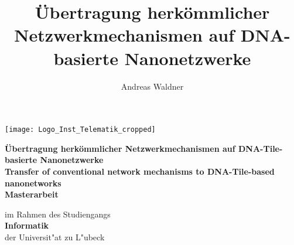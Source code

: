

\newcommand{\titlepageskip}{\vskip 20pt}

\begin{titlepage}

\title{Übertragung herkömmlicher Netzwerkmechanismen auf DNA-basierte Nanonetzwerke}
\author{Andreas Waldner}

{\Large
	\texttt{[image: Logo\_Inst\_Telematik\_cropped]}
	\vskip 44pt


	\textbf{\LARGE Übertragung herkömmlicher Netzwerkmechanismen auf DNA-Tile-basierte Nanonetzwerke}\\
	\textbf{\LARGE Transfer of conventional network mechanisms to DNA-Tile-based nanonetworks}\\
	\titlepageskip
	\textbf{Masterarbeit}

	\titlepageskip
	im Rahmen des Studiengangs\\
	\textbf{Informatik}\\
	der Universit"at zu L"ubeck

}
\end{titlepage}
